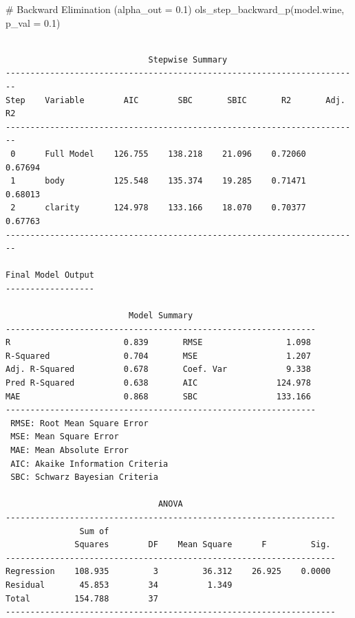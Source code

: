 \documentclass[
  letterpaper,
]{scrbook}
\newenvironment{Shaded}{\begin{snugshade}}{\end{snugshade}}
\newcommand{\AttributeTok}[1]{\textcolor[rgb]{0.40,0.45,0.13}{#1}}
\newcommand{\CommentTok}[1]{\textcolor[rgb]{0.37,0.37,0.37}{#1}}
\newcommand{\FloatTok}[1]{\textcolor[rgb]{0.68,0.00,0.00}{#1}}
\newcommand{\FunctionTok}[1]{\textcolor[rgb]{0.28,0.35,0.67}{#1}}
\newcommand{\NormalTok}[1]{\textcolor[rgb]{0.00,0.23,0.31}{#1}}
\begin{document}
\begin{Shaded}
\begin{Highlighting}[]
\CommentTok{\# Backward Elimination (alpha\_out = 0.1)}
\FunctionTok{ols\_step\_backward\_p}\NormalTok{(model.wine, }\AttributeTok{p\_val =} \FloatTok{0.1}\NormalTok{)}
\end{Highlighting}
\end{Shaded}

\begin{verbatim}

                             Stepwise Summary                             
------------------------------------------------------------------------
Step    Variable        AIC        SBC       SBIC       R2       Adj. R2 
------------------------------------------------------------------------
 0      Full Model    126.755    138.218    21.096    0.72060    0.67694 
 1      body          125.548    135.374    19.285    0.71471    0.68013 
 2      clarity       124.978    133.166    18.070    0.70377    0.67763 
------------------------------------------------------------------------

Final Model Output 
------------------

                         Model Summary                          
---------------------------------------------------------------
R                       0.839       RMSE                 1.098 
R-Squared               0.704       MSE                  1.207 
Adj. R-Squared          0.678       Coef. Var            9.338 
Pred R-Squared          0.638       AIC                124.978 
MAE                     0.868       SBC                133.166 
---------------------------------------------------------------
 RMSE: Root Mean Square Error 
 MSE: Mean Square Error 
 MAE: Mean Absolute Error 
 AIC: Akaike Information Criteria 
 SBC: Schwarz Bayesian Criteria 

                               ANOVA                                
-------------------------------------------------------------------
               Sum of                                              
              Squares        DF    Mean Square      F         Sig. 
-------------------------------------------------------------------
Regression    108.935         3         36.312    26.925    0.0000 
Residual       45.853        34          1.349                     
Total         154.788        37                                    
-------------------------------------------------------------------


\end{verbatim}
\end{document}
